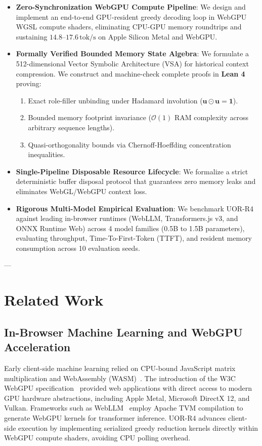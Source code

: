 \documentclass[11pt,a4paper]{article}
\theoremstyle{plain}
\theoremstyle{definition}
\theoremstyle{remark}
\begin{document}
\begin{itemize}[leftmargin=*]
    \item \textbf{Zero-Synchronization WebGPU Compute Pipeline}: We design and implement an end-to-end GPU-resident greedy decoding loop in WebGPU WGSL compute shaders, eliminating CPU-GPU memory roundtrips and sustaining $14.8\text{--}17.6\,\text{tok/s}$ on Apple Silicon Metal and WebGPU.
    \item \textbf{Formally Verified Bounded Memory State Algebra}: We formulate a 512-dimensional Vector Symbolic Architecture (VSA) for historical context compression. We construct and machine-check complete proofs in \textbf{Lean 4} proving:
    \begin{enumerate}
        \item Exact role-filler unbinding under Hadamard involution ($\bm{u} \odot \bm{u} = \bm{1}$).
        \item Bounded memory footprint invariance ($\mathcal{O}(1)$ RAM complexity across arbitrary sequence lengths).
        \item Quasi-orthogonality bounds via Chernoff-Hoeffding concentration inequalities.
    \end{enumerate}
    \item \textbf{Single-Pipeline Disposable Resource Lifecycle}: We formalize a strict deterministic buffer disposal protocol that guarantees zero memory leaks and eliminates WebGL/WebGPU context loss.
    \item \textbf{Rigorous Multi-Model Empirical Evaluation}: We benchmark UOR-R4 against leading in-browser runtimes (WebLLM, Transformers.js v3, and ONNX Runtime Web) across 4 model families (0.5B to 1.5B parameters), evaluating throughput, Time-To-First-Token (TTFT), and resident memory consumption across 10 evaluation seeds.
\end{itemize}

---

\section{Related Work}
\label{sec:related}

\subsection{In-Browser Machine Learning and WebGPU Acceleration}
Early client-side machine learning relied on CPU-bound JavaScript matrix multiplication and WebAssembly (WASM)~\cite{haas2017bringing}. The introduction of the W3C WebGPU specification~\cite{w3c_webgpu} provided web applications with direct access to modern GPU hardware abstractions, including Apple Metal, Microsoft DirectX 12, and Vulkan. Frameworks such as WebLLM~\cite{chen2024webllm} employ Apache TVM compilation to generate WebGPU kernels for transformer inference. UOR-R4 advances client-side execution by implementing serialized greedy reduction kernels directly within WebGPU compute shaders, avoiding CPU polling overhead.
\end{document}
